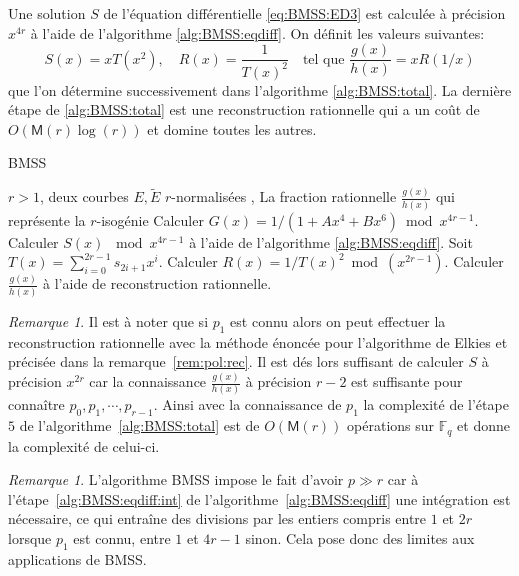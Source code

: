 \documentclass[10pt,a4paper]{book}
\theoremstyle{plain}
\theoremstyle{definition}
\theoremstyle{definition}
\theoremstyle{definition}
\theoremstyle{definition}
\theoremstyle{remark}
\newtheorem{rem}[thm]{Remarque}
\theoremstyle{remark}
\theoremstyle{definition}
\begin{document}
Une solution $S$ de l'équation différentielle \eqref{eq:BMSS:ED3} est calculée à précision $x^{4r}$ à l'aide de l'algorithme \ref{alg:BMSS:eqdiff}. On définit les valeurs suivantes:
\begin{equation}
S(x)=xT(x^2), \quad R(x)=\frac{1}{T(x)^2} \quad \text{tel que } \frac{g(x)}{h(x)}=xR(1/x)
\end{equation}
que l'on détermine successivement dans l'algorithme \ref{alg:BMSS:total}. La dernière étape de \ref{alg:BMSS:total} est une reconstruction rationnelle qui a un coût de $O(\mathsf{M}(r)\log(r))$ \cite[Théorème 7.5]{algeff17} et domine toutes les autres.

\begin{algorithm}
\caption{\label{alg:BMSS:total} BMSS}
\begin{algorithmic}[1]
\REQUIRE $r>1$, deux courbes $E,\tilde{E}$ $r$-normalisées  ,%
\ENSURE La fraction rationnelle $\frac{g(x)}{h(x)}$ qui représente la $r$-isogénie
\STATE Calculer $G(x)=1/(1+Ax^4+Bx^6) \bmod x^{4r-1}$.
\STATE \label{alg:BMSS:total:eqdiff} Calculer $S(x)$ $\bmod x^{4r-1}$ à l'aide de l'algorithme \ref{alg:BMSS:eqdiff}.
\STATE Soit $T(x)=\sum_{i=0}^{2r-1}s_{2i+1}x^i$.
\STATE Calculer $R(x)=1/T(x)^2 \bmod(x^{2r-1})$.
\STATE Calculer $\frac{g(x)}{h(x)}$ à l'aide de reconstruction rationnelle. 
\end{algorithmic}
\end{algorithm}

\begin{rem}
Il est à noter que si $p_1$ est connu alors on peut effectuer la reconstruction
rationnelle avec la méthode énoncée pour l'algorithme de Elkies et précisée 
dans la remarque~\ref{rem:pol:rec}. Il est dés lors suffisant de calculer $S$ à
précision $x^{2r}$ car la connaissance $\frac{g(x)}{h(x)}$ à précision 
$r-2$ est suffisante pour connaître $p_0,p_1,\cdots ,p_{r-1}$. Ainsi avec
la connaissance de $p_1$ la complexité de l'étape $5$ de 
l'algorithme~\ref{alg:BMSS:total} est de $O(\mathsf{M}(r))$ opérations sur 
$\mathbb{F}_q$ et donne la complexité de celui-ci.
\end{rem}

\begin{rem}
L'algorithme BMSS impose le fait d'avoir $p \gg r$ car à 
l'étape~\ref{alg:BMSS:eqdiff:int} de l'algorithme~\ref{alg:BMSS:eqdiff} une 
intégration est nécessaire, ce qui entraîne des divisions par les entiers 
compris entre $1$ et $2r$ lorsque $p_1$ est connu, entre $1$ et $4r-1$ 
sinon. Cela pose donc des limites aux applications de BMSS.
\end{rem}
\end{document}
